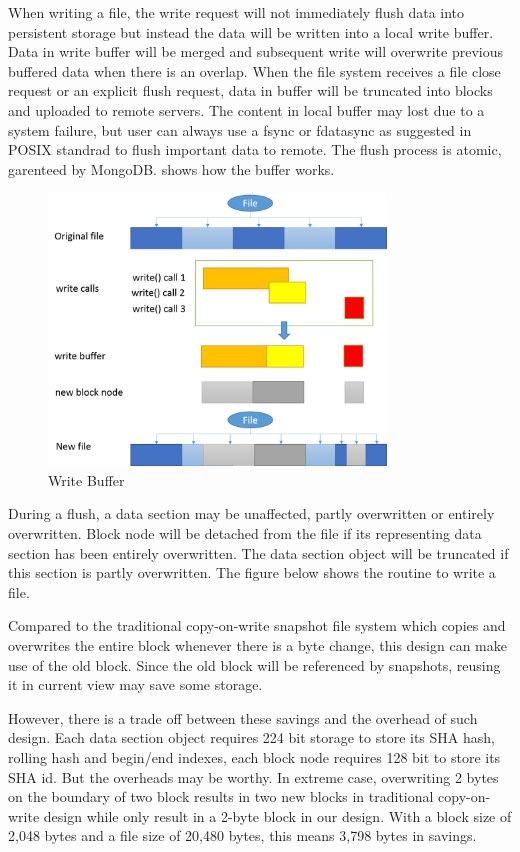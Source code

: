 	When writing a file, the write request will not immediately flush data into persistent storage but instead the data will be written into a local write buffer. Data in write buffer will be merged and subsequent write will overwrite previous buffered data when there is an overlap. When the file system receives a file close request or an explicit flush request, data in buffer will be truncated into blocks and uploaded to remote servers. The content in local buffer may lost due to a system failure, but user can always use a fsync or fdatasync as suggested in POSIX standrad to flush important data to remote. The flush process is atomic, garenteed by MongoDB.  shows how the buffer works.

\begin{figure}[hbtp]
\centering
\includegraphics[width=0.8\textwidth]{Chapter-3/figs/fig11.png}
\caption{Write Buffer}
\label{fig:buffer}
\end{figure}

	During a flush, a data section may be unaffected, partly overwritten or entirely overwritten. Block node will be detached from the file if its representing data section has been entirely overwritten. The data section object will be truncated if this section is partly overwritten. The figure below shows the routine to write a file.


    Compared to the traditional copy-on-write snapshot file system which copies and overwrites the entire block whenever there is a byte change, this design can make use of the old block. Since the old block will be referenced by snapshots, reusing it in current view may save some storage.

    However, there is a trade off between these savings and the overhead of such design. Each data section object requires 224 bit storage to store its SHA hash, rolling hash and begin/end indexes, each block node requires 128 bit to store its SHA id. But the overheads may be worthy. In extreme case, overwriting 2 bytes on the boundary of two block results in two new blocks in traditional copy-on-write design while only result in a 2-byte block in our design. With a block size of 2,048 bytes and a file size of 20,480 bytes, this means 3,798 bytes in savings.

